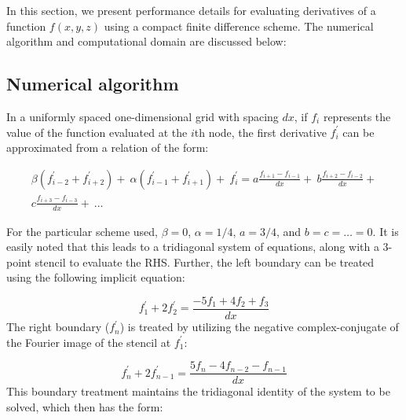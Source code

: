 \documentclass{elsarticle}
\begin{document}
In this section, we present performance details
for evaluating derivatives of a function $f(x, y, z)$
using a compact finite difference scheme.
The numerical algorithm and computational domain are
discussed below:

\subsection{Numerical algorithm}

In a uniformly spaced one-dimensional grid with spacing $dx$,
if $f_i$ represents the value of
the function evaluated at the $i$th node,
the first derivative $f^{\prime}_i$ can be approximated from
a relation of the form:

\begin{equation}
\begin{split}
    \beta(f^{\prime}_{i-2} + f^{\prime}_{i+2}) + \
    \alpha(f^{\prime}_{i-1} + f^{\prime}_{i+1}) + \
        f^{\prime}_i
    = 
    a\frac{f_{i+1} - f_{i-1}}{dx} + \
    b\frac{f_{i+2} - f_{i-2}}{dx} + \\
    c\frac{f_{i+3} - f_{i-3}}{dx} + \
    \hdots
\end{split}
\label{eqn:general-compact}
\end{equation}

For the particular scheme used, $\beta=0$, $\alpha = 1/4$,
$a = 3/4$, and $b = c = \hdots = 0$.
It is easily noted that this leads to a tridiagonal system of equations,
along with a 3-point stencil to evaluate the RHS.
Further, the left boundary can be treated using the following implicit equation:

\begin{equation}
    f^{\prime}_1 + 2f^{\prime}_2 = \frac{-5f_1 + 4f_2 + f_3}{dx}
\end{equation}
%
The right boundary ($f^{\prime}_{n}$) is treated by utilizing
the negative complex-conjugate of the Fourier image of the stencil
at $f^{\prime}_1$:

\begin{equation}
    f^{\prime}_{n} + 2f^{\prime}_{n-1}
    =
    \frac{5f_{n} - 4f_{n-2} -  f_{n-1}}{dx}
\end{equation}
%
This boundary treatment maintains the tridiagonal identity
of the system to be solved, which then has the form:
\end{document}
